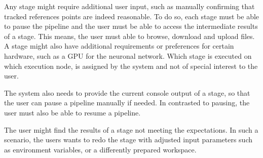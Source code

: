 Any stage might require additional user input, such as manually confirming that tracked references points are indeed reasonable.
To do so, each stage must be able to pause the pipeline and the user must be able to access the intermediate results of a stage.
This means, the user must able to browse, download and upload files.
A stage might also have additional requirements or preferences for certain hardware, such as a GPU for the neuronal network.
Which stage is executed on which execution node, is assigned by the system and not of special interest to the user. 

The system also needs to provide the current console output of a stage, so that the user can pause a pipeline manually if needed.
In contrasted to pausing, the user must also be able to resume a pipeline.

The user might find the results of a stage not meeting the expectations.
In such a scenario, the users wants to redo the stage with adjusted input parameters such as environment variables, or a differently prepared workspace.


